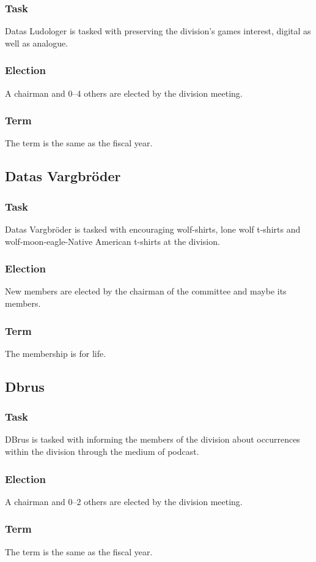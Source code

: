 \subsubsection{Task}
Datas Ludologer is tasked with preserving the division's games interest, digital as well as analogue. 
\subsubsection{Election}
A chairman and 0--4 others are elected by the division meeting. 
\subsubsection{Term}
The term is the same as the fiscal year. 

\subsection{Datas Vargbröder}
\subsubsection{Task}
Datas Vargbröder is tasked with encouraging wolf-shirts, lone wolf t-shirts and wolf-moon-eagle-Native American t-shirts at the division. 
\subsubsection{Election}
New members are elected by the chairman of the committee and maybe its members. 
\subsubsection{Term}
The membership is for life. 

\subsection{Dbrus}
\subsubsection{Task}
DBrus is tasked with informing the members of the division about occurrences within the division through the medium of podcast. 
\subsubsection{Election}
A chairman and 0--2 others are elected by the division meeting. 
\subsubsection{Term}
The term is the same as the fiscal year. 

